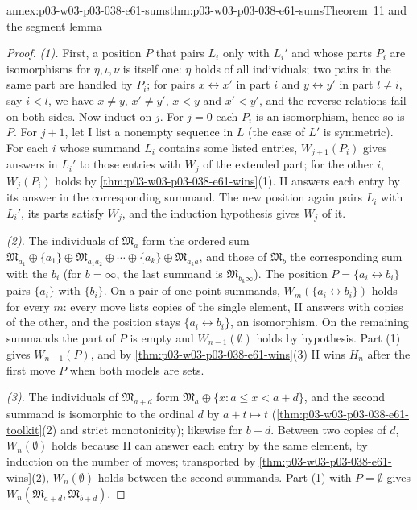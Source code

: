 \begin{annexitem}{annex:p03-w03-p03-038-e61-sums}{thm:p03-w03-p03-038-e61-sums}{Theorem~11 and the segment lemma}
\begin{proof}
\emph{(1).} First, a position \(P\) that pairs \(L_i\) only with \(L_i'\)
and whose parts \(P_i\) are isomorphisms for \(\eta,\iota,\nu\) is itself
one: \(\eta\) holds of all individuals; two pairs in the same part are
handled by \(P_i\); for pairs \(x\leftrightarrow x'\) in part \(i\) and
\(y\leftrightarrow y'\) in part \(l\ne i\), say \(i<l\), we have
\(x\ne y\), \(x'\ne y'\), \(x<y\) and \(x'<y'\), and the reverse
relations fail on both sides. Now induct on \(j\). For \(j=0\) each
\(P_i\) is an isomorphism, hence so is \(P\). For \(j+1\), let I list a
nonempty sequence in \(L\) (the case of \(L'\) is symmetric). For each
\(i\) whose summand \(L_i\) contains some listed entries, \(W_{j+1}(P_i)\)
gives answers in \(L_i'\) to those entries with \(W_j\) of the extended
part; for the other \(i\), \(W_j(P_i)\) holds by
\cref{thm:p03-w03-p03-038-e61-wins}(1). II answers each entry by its
answer in the corresponding summand. The new position again pairs \(L_i\)
with \(L_i'\), its parts satisfy \(W_j\), and the induction hypothesis
gives \(W_j\) of it.

\emph{(2).} The individuals of \(\mathfrak M_a\) form the ordered sum
\(\mathfrak M_{a_1}\oplus\{a_1\}\oplus\mathfrak M_{a_1a_2}\oplus\cdots
\oplus\{a_k\}\oplus\mathfrak M_{a_ka}\), and those of \(\mathfrak M_b\)
the corresponding sum with the \(b_i\) (for \(b=\infty\), the last
summand is \(\mathfrak M_{b_k\infty}\)). The position
\(P=\{a_i\leftrightarrow b_i\}\) pairs \(\{a_i\}\) with \(\{b_i\}\). On
a pair of one-point summands, \(W_m(\{a_i\leftrightarrow b_i\})\) holds
for every \(m\): every move lists copies of the single element, II
answers with copies of the other, and the position stays
\(\{a_i\leftrightarrow b_i\}\), an isomorphism. On the remaining summands
the part of \(P\) is empty and \(W_{n-1}(\emptyset)\) holds by hypothesis.
Part (1) gives \(W_{n-1}(P)\), and by
\cref{thm:p03-w03-p03-038-e61-wins}(3) II wins \(H_n\) after the first
move \(P\) when both models are sets.

\emph{(3).} The individuals of \(\mathfrak M_{a+d}\) form
\(\mathfrak M_a\oplus\{x:a\le x<a+d\}\), and the second summand is
isomorphic to the ordinal \(d\) by \(a+t\mapsto t\)
(\cref{thm:p03-w03-p03-038-e61-toolkit}(2) and strict monotonicity);
likewise for \(b+d\). Between two copies of \(d\), \(W_n(\emptyset)\)
holds because II can answer each entry by the same element, by induction
on the number of moves; transported by
\cref{thm:p03-w03-p03-038-e61-wins}(2), \(W_n(\emptyset)\) holds between
the second summands. Part (1) with \(P=\emptyset\) gives
\(W_n(\mathfrak M_{a+d},\mathfrak M_{b+d})\).
\end{proof}
\end{annexitem}

